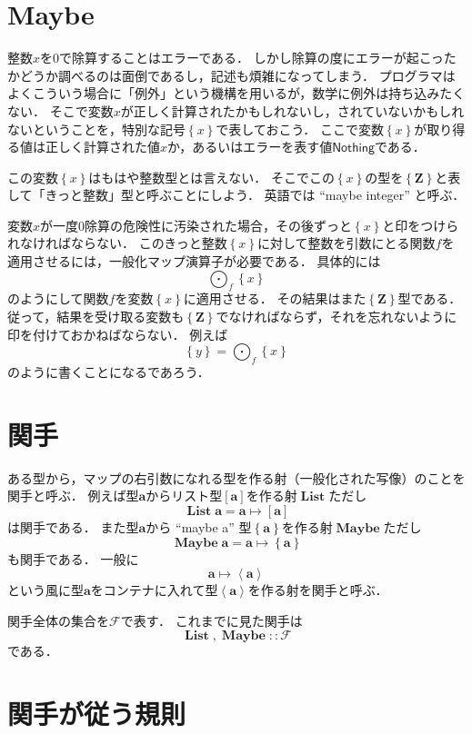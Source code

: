 \documentclass[twocolumn]{jsbook}
\newcommand{\mapfunc}{\bigodot}
\newcommand{\typename}[1]{\bm{#1}}
\newcommand{\integertype}{\typename{Z}}
\newcommand{\typeclassname}[1]{\mathcal{#1}}
\newcommand{\functortypeclass}{\typeclassname{F}}
\newcommand{\generalcontainer}[1]{\left\langle#1\right\rangle}
\newcommand{\listtype}[1]{\left[#1\right]}
\newcommand{\maybe}[1]{\left\{#1\right\}}
\newcommand{\functor}[1]{\mathop{\textbf{#1}}}
\newcommand{\listfunctor}{\mathop{\functor{List}}}
\newcommand{\maybefunctor}{\mathop{\functor{Maybe}}}
\newcommand{\specialkeyword}[1]{\textsf{#1}}
\newcommand{\nothing}{\specialkeyword{Nothing}}
\begin{document}
\section{Maybe}

整数$x$を$0$で除算することはエラーである．
しかし除算の度にエラーが起こったかどうか調べるのは面倒であるし，記述も煩雑になってしまう．
プログラマはよくこういう場合に「例外」という機構を用いるが，数学に例外は持ち込みたくない．
そこで変数$x$が正しく計算されたかもしれないし，されていないかもしれないということを，特別な記号$\maybe{x}$で表しておこう．
ここで変数$\maybe{x}$が取り得る値は正しく計算された値$x$か，あるいはエラーを表す値$\nothing$である．

この変数$\maybe{x}$はもはや整数型とは言えない．
そこでこの$\maybe{x}$の型を$\maybe{\integertype}$と表して「きっと整数」型と呼ぶことにしよう．
英語では ``maybe integer'' と呼ぶ．

変数$x$が一度$0$除算の危険性に汚染された場合，その後ずっと$\maybe{x}$と印をつけられなければならない．
このきっと整数$\maybe{x}$に対して整数を引数にとる関数$f$を適用させるには，一般化マップ演算子が必要である．
具体的には$$\mapfunc_f\maybe{x}$$のようにして関数$f$を変数$\maybe{x}$に適用させる．
その結果はまた$\maybe{\integertype}$型である．
従って，結果を受け取る変数も$\maybe{\integertype}$でなければならず，それを忘れないように印を付けておかねばならない．
例えば$$\maybe{y}=\mapfunc_f\maybe{x}$$のように書くことになるであろう．

\section{関手}

ある型から，マップの右引数になれる型を作る射（一般化された写像）のことを関手と呼ぶ．
例えば型$\typename{a}$からリスト型$[\typename{a}]$を作る射$\listfunctor$ただし$$\listfunctor\typename{a}=\typename{a}\mapsto\listtype{\typename{a}}$$は関手である．
また型$\typename{a}$から ``maybe a'' 型$\maybe{\typename{a}}$を作る射$\maybefunctor$ただし$$\maybefunctor\typename{a}=\typename{a}\mapsto\maybe{\typename{a}}$$も関手である．
一般に$$\typename{a}\mapsto\generalcontainer{\typename{a}}$$という風に型$\typename{a}$をコンテナに入れて型$\generalcontainer{\typename{a}}$を作る射を関手と呼ぶ．

関手全体の集合を$\functortypeclass$で表す．
これまでに見た関手は$$\listfunctor,\maybefunctor::\functortypeclass$$である．

\section{関手が従う規則}
\end{document}
